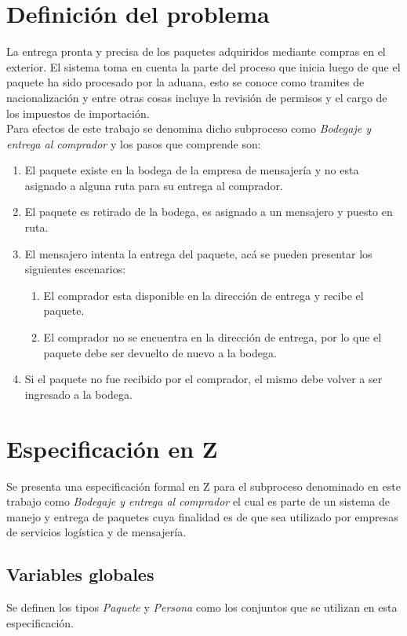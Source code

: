 \documentclass[12pt,a4paper]{article}
\begin{document}
\section{Definición del problema}
La entrega pronta y precisa de los paquetes adquiridos mediante compras en el exterior. El sistema toma en cuenta la parte del proceso que inicia luego de que el paquete ha sido procesado por la aduana, esto se conoce como tramites de nacionalización y entre otras cosas incluye la revisión de permisos y el cargo de los impuestos de importación. \\Para efectos de este trabajo se denomina dicho subproceso como \textit{Bodegaje y entrega al comprador} y los pasos que comprende son:
\begin{enumerate}
\item El paquete existe en la bodega de la empresa de mensajería y no esta asignado a alguna ruta para su entrega al comprador.
\item El paquete es retirado de la bodega, es asignado a un mensajero y puesto en ruta.
\item El mensajero intenta la entrega del paquete, acá se pueden presentar los siguientes escenarios:
\begin{enumerate}
\item El comprador esta disponible en la dirección de entrega y recibe el paquete.
\item El comprador no se encuentra en la dirección de entrega, por lo que el paquete debe ser devuelto de nuevo a la bodega.
\end{enumerate}
\item Si el paquete no fue recibido por el comprador, el mismo debe volver a ser ingresado a la bodega.
\end{enumerate}

\newpage
\section{Especificación en Z}

Se presenta una especificación formal en Z para el subproceso denominado en este trabajo como \textit{Bodegaje y entrega al comprador} el cual es parte de un sistema de manejo y entrega de paquetes cuya finalidad es de que sea utilizado por empresas de servicios logística y de mensajería.  

\subsection{Variables globales}
Se definen los tipos \textit{Paquete} y \textit{Persona} como los conjuntos que se utilizan en esta especificación. 
\end{document}
